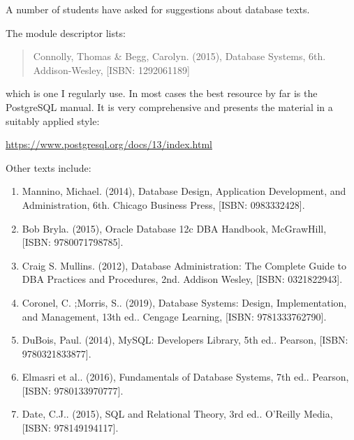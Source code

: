 A number of students have asked for suggestions about database texts.

The module descriptor lists:

\begin{quotation}
Connolly, Thomas \& Begg, Carolyn. (2015), Database Systems, 6th. Addison-Wesley, [ISBN: 1292061189]
\end{quotation}

which is one I regularly use.
In most cases the best resource by far is the PostgreSQL manual.
It is very comprehensive and presents the material in a suitably applied style:

\url{https://www.postgresql.org/docs/13/index.html}

Other texts include:

\begin{enumerate}
\item Mannino, Michael. (2014), Database Design, Application Development, and Administration, 6th. Chicago Business Press, [ISBN: 0983332428].
\item Bob Bryla. (2015), Oracle Database 12c DBA Handbook, McGrawHill, [ISBN: 9780071798785].
\item Craig S. Mullins. (2012), Database Administration: The Complete Guide to DBA Practices and Procedures, 2nd. Addison Wesley, [ISBN: 0321822943].
\item Coronel, C. ;Morris, S.. (2019), Database Systems: Design, Implementation, and Management, 13th ed.. Cengage Learning, [ISBN: 9781333762790].
\item DuBois, Paul. (2014), MySQL: Developers Library, 5th ed.. Pearson, [ISBN: 9780321833877].
\item Elmasri et al.. (2016), Fundamentals of Database Systems, 7th ed.. Pearson, [ISBN: 9780133970777].
\item Date, C.J.. (2015), SQL and Relational Theory, 3rd ed.. O'Reilly Media, [ISBN: 978149194117].
\end{enumerate}

